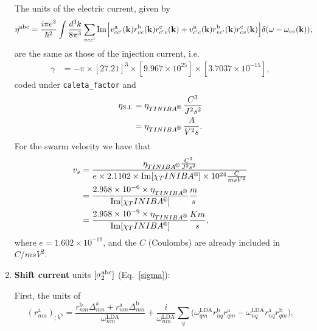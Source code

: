 \documentclass[12pt]{article}
\numberwithin{equation}{section}
\begin{document}
\begin{enumerate}
The units of the electric current, given by
\begin{align}\label{ec.3}
\eta^{\mathrm{a}\mathrm{b}\mathrm{c}} 
&=
\frac{i\pi e^3}{\hbar^2}
\int\frac{d^3k}{8\pi^3}
\sum_{vcc'}
\mathrm{Im}\Big[ 
v^{\mathrm{a}}_{cc'}(\mathbf{k}) r^{\mathrm{b}}_{vc}(\mathbf{k}) r^{\mathrm{c}}_{c'v}(\mathbf{k}) 
+
v^{\mathrm{a}}_{c'c}(\mathbf{k}) r^{\mathrm{b}}_{vc'}(\mathbf{k}) r^{\mathrm{c}}_{cv}(\mathbf{k}) 
\Big]
\delta(\omega-\omega_{cv}(\mathbf{k})) 
,
\end{align}
are the same as those of the injection current, i.e.
\begin{align}\label{gam_eta_ec}
\gamma 
 & =
-\pi 
\times 
[27.21]^3 
\times 
[9.967\times 10^{25}]
\times[3.7037\times 10^{-15}]
,
\end{align}
coded under \verb=caleta_factor=
and  
\begin{align}\label{u_eta_ec}
\eta_{\mathrm{S.I.}}
&=\eta_{\tiniba}\,
\frac{C^3}{J^2 s^2}
\nonumber\\
&=\eta_{\tiniba}\,
\frac{A}{V^2 s}
.  
\end{align} 
For the swarm velocity we have that
\begin{align}\label{sv.1}
v_s&=\frac{\eta_{\tiniba}
\frac{C^3}{J^2s^2}}
{e\times 2.1102\times\mathrm{Im}[\chi_\tiniba]
\times 10^{24}\frac{C}{msV^2}}
\nonumber\\
&=\frac{2.958\times 10^{-6}\times\eta_{\tiniba}}{\mathrm{Im}[\chi_\tiniba]}\frac{m}{s}
\nonumber\\
&=\frac{2.958\times 10^{-9}\times\eta_{\tiniba}}{\mathrm{Im}[\chi_\tiniba]}\frac{Km}{s}
,
\end{align}
where $e=1.602\times 10^{-19}$, and the $C$ (Coulombs) are already
included in $C/msV^2$.


\item {\bf Shift current} units $[\sigma^{\mathrm{a}\mathrm{b}\mathrm{c}}_2]$ (Eq.~\eqref{sigma}):

First, the units of 
\begin{equation}
(r^{\mathrm{a}}_{nm})_{;k^{\mathrm{b}}}
=
\frac{ 
r^{\mathrm{b}}_{nm}
\Delta^{\mathrm{a}}_{mn}
+r^{\mathrm{a}}_{nm}
\Delta^{\mathrm{b}}_{mn}
}
{\omega^\mathrm{LDA}_{nm}}
+
\frac{i}{\omega^\mathrm{LDA}_{nm}}
\sum_{q}
\bigg(
\omega^\mathrm{LDA}_{q m} 
r^{\mathrm{b}}_{nq} 
r^{\mathrm{a}}_{q m}
-
\omega^\mathrm{LDA}_{nq} 
r^{\mathrm{a}}_{nq} 
r^{\mathrm{b}}_{q m}
\bigg) 
,
\label{rka}
\end{equation} 


\end{enumerate}
\end{document}
